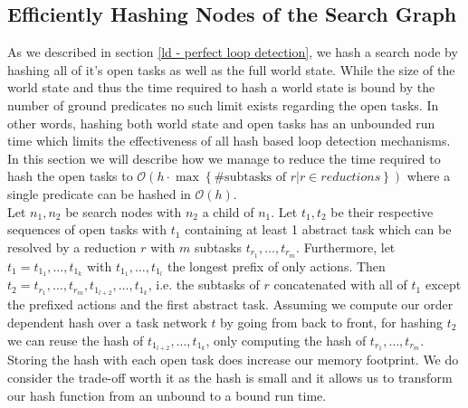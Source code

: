 \begin{comment}
\subsection{Preceding Plan}
\todo{Section no longer valid for current crowd?}
In the initial implementation each node stored the full preceding plan as a sequence of all reductions that were applied so far. This leads to roughly quadratic overhead (sum over 1..n, only roughly as not each step increases the length. Wait, is it roughly, then? Probably, as the fraction of steps that increment the preceding plan should be kinda constant)
This duplication was not needed. The newer implementation instead stores an optional<reduction> in each node. I.e., the preceding reduction is stored if one exists, nothing if there isn't one. When the preceding plan is needed, either for communication or to extract a plan, the current search path is iterated and all reductions are accumulated.
\end{comment}

\subsection{Efficiently Hashing Nodes of the Search Graph}
As we described in section \ref{ld - perfect loop detection}, we hash a search node by hashing all of it's open tasks as well as the full world state. While the size of the world state and thus the time required to hash a world state is bound by the number of ground predicates no such limit exists regarding the open tasks. In other words, hashing both world state and open tasks has an unbounded run time which limits the effectiveness of all hash based loop detection mechanisms. In this section we will describe how we manage to reduce the time required to hash the open tasks to $\mathcal{O}(h \cdot \max \left\{ \text{\# subtasks of } r | r \in reductions \right\})$ where a single predicate can be hashed in $\mathcal{O}(h)$. \\
Let $n_1, n_2$ be search nodes with $n_2$ a child of $n_1$. Let $t_1, t_2$ be their respective sequences of open tasks with $t_1$ containing at least 1 abstract task which can be resolved by a reduction $r$ with $m$ subtasks $t_{r_1}, \ldots, t_{r_m}$. Furthermore, let $t_1 = t_{1_1}, \ldots, t_{1_k}$ with $t_{1_1}, \ldots, t_{1_l}$ the longest prefix of only actions. Then $t_2 = t_{r_1}, \ldots, t_{r_m}, t_{1_{l+2}}, \ldots, t_{1_k}$, i.e. the subtasks of $r$ concatenated with all of $t_1$ except the prefixed actions and the first abstract task. Assuming we compute our order dependent hash over a task network $t$ by going from back to front, for hashing $t_2$ we can reuse the hash of $t_{1_{l+2}}, \ldots, t_{1_k}$, only computing the hash of $t_{r_1}, \ldots, t_{r_m}$. \\
Storing the hash with each open task does increase our memory footprint. We do consider the trade-off worth it as the hash is small and it allows us to transform our hash function from an unbound to a bound run time.

